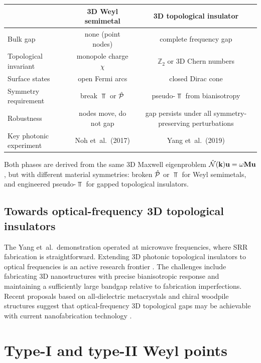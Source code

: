 \begin{center}
\begin{tabular}{lcc}
  \toprule
  & \textbf{3D Weyl semimetal} & \textbf{3D topological insulator} \\
  \midrule
  Bulk gap & none (point nodes) & complete frequency gap \\
  Topological invariant & monopole charge $\chi$ & $\mathbb{Z}_2$ or
    3D Chern numbers \\
  Surface states & open Fermi arcs & closed Dirac cone \\
  Symmetry requirement & break $\Top$ or $\hat{\mathcal{P}}$ & pseudo-$\Top$ from
    bianisotropy \\
  Robustness & nodes move, do not gap & gap persists under all
    symmetry-preserving perturbations \\
  Key photonic experiment & Noh et~al.\ (2017) & Yang et~al.\ (2019) \\
  \bottomrule
\end{tabular}
\end{center}

Both phases are derived from the same 3D Maxwell eigenproblem
$\hat{\mathcal{N}}(\mathbf{k})\mathbf{u}=\omega\mathbf{M}\mathbf{u}$, but with different
material symmetries: broken $\hat{\mathcal{P}}$ or $\Top$ for Weyl semimetals,
and engineered pseudo-$\Top$ for gapped topological insulators.

\subsection{Towards optical-frequency 3D topological insulators}
\label{sec:ch15-optical-3dti}

The Yang et~al.\ demonstration operated at microwave frequencies, where
SRR fabrication is straightforward.  Extending 3D photonic topological
insulators to optical frequencies is an active research frontier
\cite{price2022roadmap}.  The challenges include fabricating 3D
nanostructures with precise bianisotropic response and maintaining a
sufficiently large bandgap relative to fabrication imperfections.  Recent
proposals based on all-dielectric metacrystals and chiral woodpile
structures suggest that optical-frequency 3D topological gaps may be
achievable with current nanofabrication technology \cite{khanikaev2016three}.

\section{Type-I and type-II Weyl points}
\label{sec:ch15-types}

